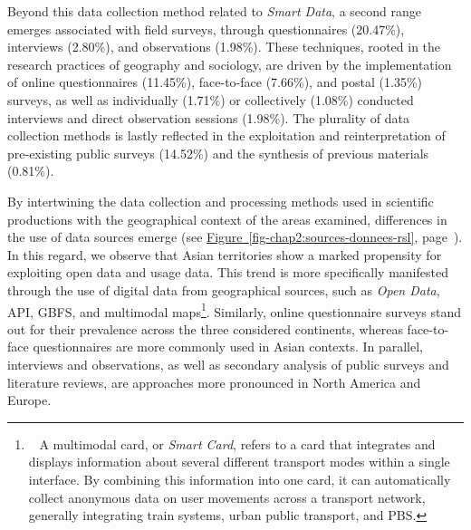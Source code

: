\begin{refsegment}
Beyond this data collection method related to \textsl{Smart Data}, a second range emerges associated with field surveys, through questionnaires (20.47\%), interviews (2.80\%), and observations (1.98\%). These techniques, rooted in the research practices of geography and sociology, are driven by the implementation of online questionnaires (11.45\%), face-to-face (7.66\%), and postal (1.35\%) surveys, as well as individually (1.71\%) or collectively (1.08\%) conducted interviews and direct observation sessions (1.98\%). The plurality of data collection methods is lastly reflected in the exploitation and reinterpretation of pre-existing public surveys (14.52\%) and the synthesis of previous materials (0.81\%).%

By intertwining the data collection and processing methods used in scientific productions with the geographical context of the areas examined, differences in the use of data sources emerge (see \hyperref[fig-chap2:sources-donnees-rsl]{Figure~\ref{fig-chap2:sources-donnees-rsl}}, page~\pageref{fig-chap2:sources-donnees-rsl}). In this regard, we observe that Asian territories show a marked propensity for exploiting open data and usage data. This trend is more specifically manifested through the use of digital data from geographical sources, such as \textsl{Open Data}, \acrshort{API}, \acrshort{GBFS}, and multimodal maps\footnote{~
    A multimodal card, or \textsl{Smart Card}, refers to a card that integrates and displays information about several different transport modes within a single interface. By combining this information into one card, it can automatically collect anonymous data on user movements across a transport network, generally integrating train systems, urban public transport, and \acrshort{PBS}.
}. Similarly, online questionnaire surveys stand out for their prevalence across the three considered continents, whereas face-to-face questionnaires are more commonly used in Asian contexts. In parallel, interviews and observations, as well as secondary analysis of public surveys and literature reviews, are approaches more pronounced in North America and Europe.%


\end{refsegment}

